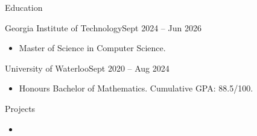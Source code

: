 \documentclass[]{mcdowellcv}
\begin{document}
	\makeheader
	\begin{cvsection}{Education}
		\begin{cvsubsection}{Georgia Institute of Technology}{}{Sept 2024 -- Jun 2026}
			\begin{itemize}
				\item Master of Science in Computer Science.
			\end{itemize}
		\end{cvsubsection}
		\begin{cvsubsection}{University of Waterloo}{}{Sept 2020 -- Aug 2024}
			\begin{itemize}
				\item Honours Bachelor of Mathematics. Cumulative GPA: 88.5/100.
			\end{itemize}
		\end{cvsubsection}
	\end{cvsection}
	
	
	\begin{cvsection}{Projects}
		\begin{cvsubsection}{}{}{}
			\begin{itemize}
				\item 
			\end{itemize}
		\end{cvsubsection}
	\end{cvsection}

	
	

	
	
	
\end{document}
